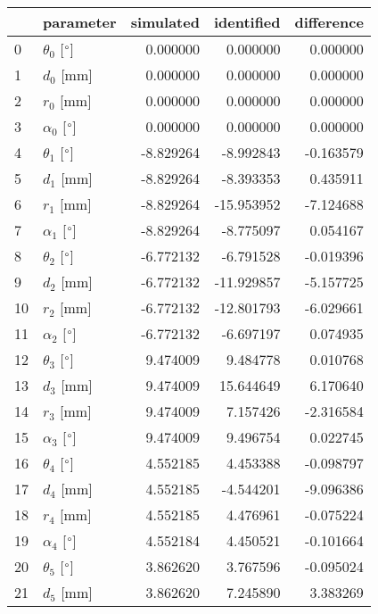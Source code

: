 \documentclass{standalone}%
\begin{document}
%
\normalsize%
\begin{tabular}{llrrr}
\toprule
{} &                 parameter & simulated & identified & difference \\
\midrule
0  &  $\theta_{0}$ [$\degree$] &  0.000000 &   0.000000 &   0.000000 \\
1  &              $d_{0}$ [mm] &  0.000000 &   0.000000 &   0.000000 \\
2  &              $r_{0}$ [mm] &  0.000000 &   0.000000 &   0.000000 \\
3  &  $\alpha_{0}$ [$\degree$] &  0.000000 &   0.000000 &   0.000000 \\
4  &  $\theta_{1}$ [$\degree$] & -8.829264 &  -8.992843 &  -0.163579 \\
5  &              $d_{1}$ [mm] & -8.829264 &  -8.393353 &   0.435911 \\
6  &              $r_{1}$ [mm] & -8.829264 & -15.953952 &  -7.124688 \\
7  &  $\alpha_{1}$ [$\degree$] & -8.829264 &  -8.775097 &   0.054167 \\
8  &  $\theta_{2}$ [$\degree$] & -6.772132 &  -6.791528 &  -0.019396 \\
9  &              $d_{2}$ [mm] & -6.772132 & -11.929857 &  -5.157725 \\
10 &              $r_{2}$ [mm] & -6.772132 & -12.801793 &  -6.029661 \\
11 &  $\alpha_{2}$ [$\degree$] & -6.772132 &  -6.697197 &   0.074935 \\
12 &  $\theta_{3}$ [$\degree$] &  9.474009 &   9.484778 &   0.010768 \\
13 &              $d_{3}$ [mm] &  9.474009 &  15.644649 &   6.170640 \\
14 &              $r_{3}$ [mm] &  9.474009 &   7.157426 &  -2.316584 \\
15 &  $\alpha_{3}$ [$\degree$] &  9.474009 &   9.496754 &   0.022745 \\
16 &  $\theta_{4}$ [$\degree$] &  4.552185 &   4.453388 &  -0.098797 \\
17 &              $d_{4}$ [mm] &  4.552185 &  -4.544201 &  -9.096386 \\
18 &              $r_{4}$ [mm] &  4.552185 &   4.476961 &  -0.075224 \\
19 &  $\alpha_{4}$ [$\degree$] &  4.552184 &   4.450521 &  -0.101664 \\
20 &  $\theta_{5}$ [$\degree$] &  3.862620 &   3.767596 &  -0.095024 \\
21 &              $d_{5}$ [mm] &  3.862620 &   7.245890 &   3.383269 \\

\end{tabular}
\end{document}
